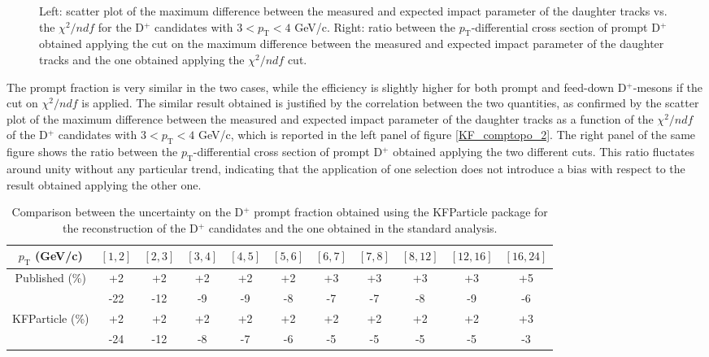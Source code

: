 \documentclass[b5paper,10pt,twoside,oldstyle,classica]{toptesi}
\newcommand{\pt}{p_\text{T}}
\begin{document}
\begin{figure}[tb]
\begin{center}
\caption{Left: scatter plot of the maximum difference between the measured and expected impact parameter of the daughter tracks vs. the $\chi^2/ndf$ for the D$^+$ candidates with $3<\pt<4$ GeV/c. Right: ratio between the $\pt$-differential cross section of prompt D$^+$ obtained applying the cut on the maximum difference between the measured and expected impact parameter of the daughter tracks and the one obtained applying the $\chi^{2}/ndf$ cut.}
\label{KF_comptopo_1}
\end{center}
\end{figure} The prompt fraction is very similar in the two cases, while the efficiency is slightly higher for both prompt and feed-down D$^+$-mesons if the cut on $\chi^2/ndf$ is applied. The similar result obtained is justified by the correlation between the two quantities, as confirmed by the scatter plot of the maximum difference between the measured and expected impact parameter of the daughter tracks as a function of the $\chi^2/ndf$ of the D$^+$ candidates with $3<\pt<4$ GeV/c, which is reported in the left panel of figure \ref{KF_comptopo_2}. The right panel of the same figure shows the ratio between the $\pt$-differential cross section of prompt D$^+$ obtained applying the two different cuts. 
This ratio fluctates around unity without any particular trend, indicating that the application of one selection does not introduce a bias with respect to the result obtained applying the other one. 
\begin{table}[b]
\centering 
\begin{center} %
\renewcommand\arraystretch{1.4} 
\fontsize{7.5}{10}\selectfont
\begin{tabular}{|c|c|c|c|c|c|c|c|c|c|c|}
\hline
$\pt$ (GeV/c) & $[1,2]$ & $[2,3]$ & $[3,4]$ & $[4,5]$ & $[5,6]$ & $[6,7]$ & $[7,8]$ & $[8,12]$ & $[12,16]$ & $[16,24]$\\
\hline
\multirow{2}{*}{Published (\%)}& +2 & +2 & +2 & +2 & +2 & +3 & +3 & +3 & +3 & +5\\
& -22 & -12 & -9 & -9 & -8 & -7 & -7 & -8 & -9 & -6\\
\hline
\multirow{2}{*}{KFParticle (\%)}& +2 & +2 & +2 & +2 & +2 & +2 & +2 & +2 & +2 & +3\\
& -24 & -12 & -8 & -7 & -6 & -5 & -5 & -5 & -5 & -3\\
\hline
\end{tabular} 
\caption{Comparison between the uncertainty on the D$^+$ prompt fraction obtained using the KFParticle package for the reconstruction of the D$^+$ candidates and the one obtained in the standard analysis.}
\label{promptfrac_syst_comp}
\end{center} 
\end{table}
\end{document}
